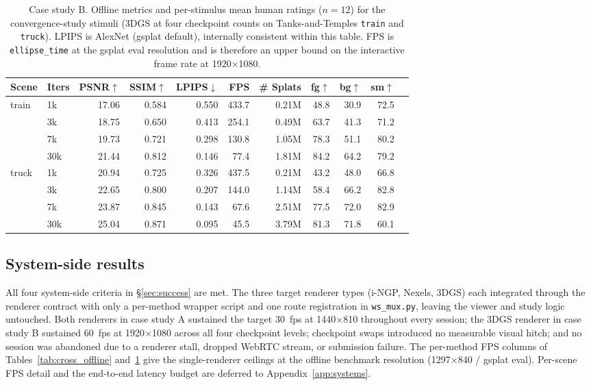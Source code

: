 \begin{table}[t]
\centering
\caption{Case study B. Offline metrics and per-stimulus mean human
ratings ($n=12$) for the convergence-study stimuli (3DGS at four
checkpoint counts on Tanks-and-Temples \texttt{train} and
\texttt{truck}). LPIPS is AlexNet (gsplat default), internally
consistent within this table. FPS is \texttt{ellipse\_time} at the
gsplat eval resolution and is therefore an upper bound on the
interactive frame rate at 1920$\times$1080.}
\label{tab:convergence}
\small
\begin{tabular}{llrrrrrrrrr}
\toprule
Scene & Iters & PSNR$\uparrow$ & SSIM$\uparrow$ & LPIPS$\downarrow$ & FPS & \# Splats & fg$\uparrow$ & bg$\uparrow$ & sm$\uparrow$ \\
\midrule
train & 1k  & 17.06 & 0.584 & 0.550 & 433.7 & 0.21M & 48.8 & 30.9 & 72.5 \\
      & 3k  & 18.75 & 0.650 & 0.413 & 254.1 & 0.49M & 63.7 & 41.3 & 71.2 \\
      & 7k  & 19.73 & 0.721 & 0.298 & 130.8 & 1.05M & 78.3 & 51.1 & 80.2 \\
      & 30k & 21.44 & 0.812 & 0.146 &  77.4 & 1.81M & 84.2 & 64.2 & 79.2 \\
truck & 1k  & 20.94 & 0.725 & 0.326 & 437.5 & 0.21M & 43.2 & 48.0 & 66.8 \\
      & 3k  & 22.65 & 0.800 & 0.207 & 144.0 & 1.14M & 58.4 & 66.2 & 82.8 \\
      & 7k  & 23.87 & 0.845 & 0.143 &  67.6 & 2.51M & 77.5 & 72.0 & 82.9 \\
      & 30k & 25.04 & 0.871 & 0.095 &  45.5 & 3.79M & 81.3 & 71.8 & 60.1 \\
\bottomrule
\end{tabular}
\end{table}

\subsection{System-side results}
\label{sec:systems_results}

All four system-side criteria in \S\ref{sec:success} are met. The
three target renderer types (i-NGP, Nexels, 3DGS) each integrated
through the renderer contract with only a per-method wrapper script
and one route registration in \texttt{ws\_mux.py}, leaving the viewer
and study logic untouched. Both renderers in case study A sustained
the target 30~fps at 1440$\times$810 throughout every session; the
3DGS renderer in case study B sustained 60~fps at 1920$\times$1080
across all four checkpoint levels; checkpoint swaps introduced no
measurable visual hitch; and no session was abandoned due to a
renderer stall, dropped WebRTC stream, or submission failure. The
per-method FPS columns of Tables~\ref{tab:cross_offline}
and~\ref{tab:convergence} give the single-renderer ceilings at the
offline benchmark resolution (1297$\times$840 / gsplat eval).
Per-scene FPS detail and the end-to-end latency budget are deferred
to Appendix~\ref{app:systems}.

